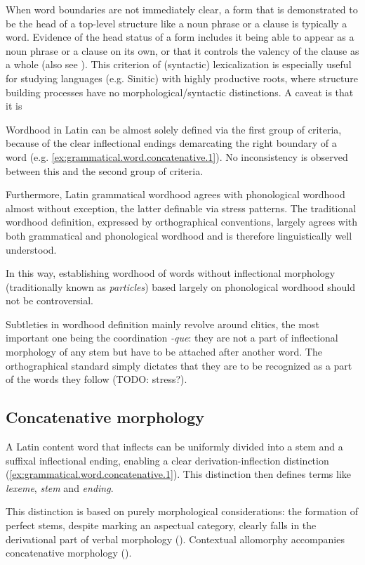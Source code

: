 \documentclass[a4paper, oneside, 12pt]{report}
\newcommand*{\term}[1]{\emph{#1}}
\newcommand{\form}[1]{\emph{#1}}
\begin{document}
When word boundaries are not immediately clear,
a form that is demonstrated to be the head of a top-level structure like a noun phrase or a clause is typically a word.
Evidence of the head status of a form includes it being able to appear as a noun phrase or a clause on its own, or that it controls the valency of the clause as a whole (also see ).
This criterion of (syntactic) lexicalization is especially useful for studying languages (e.g. Sinitic) with highly productive roots,
where structure building processes have no  morphological/syntactic distinctions.
A caveat is that it is 

Wordhood in Latin can be almost solely defined via the first group of criteria,
because of the clear inflectional endings demarcating the right boundary of a word (e.g. \ref{ex:grammatical.word.concatenative.1}).
No inconsistency is observed between this and the second group of criteria.

Furthermore, Latin grammatical wordhood agrees with phonological wordhood almost without exception, the latter definable via stress patterns.
The traditional wordhood definition, expressed by orthographical conventions, largely agrees with both grammatical and phonological wordhood and is therefore linguistically well understood.


In this way, establishing wordhood of words without inflectional morphology (traditionally known as \term{particles}) based largely on phonological wordhood should not be controversial.

Subtleties in wordhood definition mainly revolve around clitics,
the most important one being the coordination \form{-que}: 
they are not a part of inflectional morphology of any stem 
but have to be attached after another word.
The orthographical standard simply dictates that 
they are to be recognized as a part of the words they follow (TODO: stress?). 

\subsection{Concatenative morphology}

A Latin content word that inflects can be uniformly divided into a stem and a suffixal inflectional ending, enabling a clear derivation-inflection distinction (\ref{ex:grammatical.word.concatenative.1}).
This distinction then defines terms like \term{lexeme}, \term{stem} and \term{ending}.

This distinction is based on purely morphological considerations:
the formation of perfect stems, despite marking an aspectual category, clearly falls in the derivational part of verbal morphology ().
Contextual allomorphy accompanies concatenative morphology (). 
\end{document}
